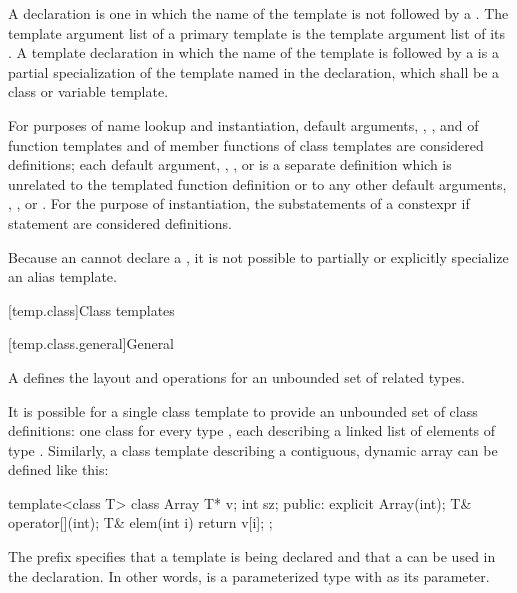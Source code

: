 \pnum
A  declaration is one
in which the name of the template is not followed by
a .
The template argument list of a primary template is
the template argument list of its .
A template declaration in which the name of the template is followed by
a  is
a partial specialization of
the template named in the declaration,
which shall be a class or variable template.

\pnum
For purposes of name lookup and instantiation,
default arguments,
,
,
and
of function templates
and
of member functions of class templates
are considered definitions;
each
default argument,
,
,
or
is a separate definition
which is unrelated
to the templated function definition or
to any other
default arguments,
,
,
or
.
For the purpose of instantiation, the substatements of a constexpr if
statement are considered definitions.

\pnum
Because an  cannot declare a
, it is not possible to partially or
explicitly specialize an alias template.

[temp.class]{Class templates}

[temp.class.general]{General}

\pnum
A
defines the layout and operations
for an unbounded set of related types.

\pnum
\begin{example}
It is possible for a single class template
to provide an unbounded set of class definitions:
one class  for every type ,
each describing a linked list of elements of type .
Similarly, a class template  describing a contiguous,
dynamic array can be defined like this:
\begin{codeblock}
template<class T> class Array {
  T* v;
  int sz;
public:
  explicit Array(int);
  T& operator[](int);
  T& elem(int i) { return v[i]; }
};
\end{codeblock}
The prefix 
specifies that a template is being declared and that a
 
can be used in the declaration.
In other words,
is a parameterized type with
as its parameter.
\end{example}

